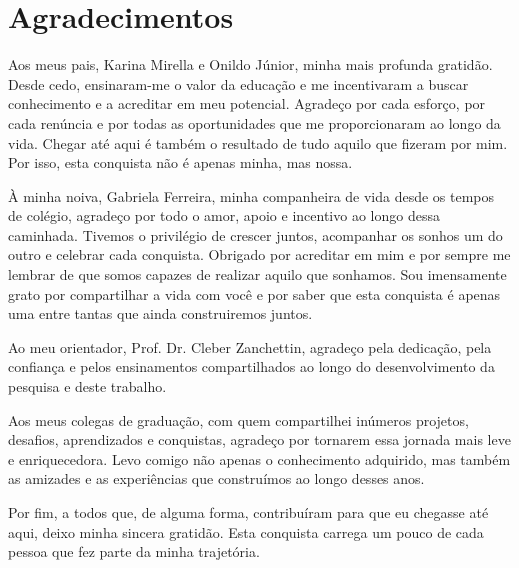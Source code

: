 \section*{Agradecimentos}

Aos meus pais, Karina Mirella e Onildo Júnior, minha mais profunda gratidão. Desde cedo, ensinaram-me o valor da educação e me incentivaram a buscar conhecimento e a acreditar em meu potencial. Agradeço por cada esforço, por cada renúncia e por todas as oportunidades que me proporcionaram ao longo da vida. Chegar até aqui é também o resultado de tudo aquilo que fizeram por mim. Por isso, esta conquista não é apenas minha, mas nossa.

À minha noiva, Gabriela Ferreira, minha companheira de vida desde os tempos de colégio, agradeço por todo o amor, apoio e incentivo ao longo dessa caminhada. Tivemos o privilégio de crescer juntos, acompanhar os sonhos um do outro e celebrar cada conquista. Obrigado por acreditar em mim e por sempre me lembrar de que somos capazes de realizar aquilo que sonhamos. Sou imensamente grato por compartilhar a vida com você e por saber que esta conquista é apenas uma entre tantas que ainda construiremos juntos.

Ao meu orientador, Prof. Dr. Cleber Zanchettin, agradeço pela dedicação, pela confiança e pelos ensinamentos compartilhados ao longo do desenvolvimento da pesquisa e deste trabalho.

Aos meus colegas de graduação, com quem compartilhei inúmeros projetos, desafios, aprendizados e conquistas, agradeço por tornarem essa jornada mais leve e enriquecedora. Levo comigo não apenas o conhecimento adquirido, mas também as amizades e as experiências que construímos ao longo desses anos.

Por fim, a todos que, de alguma forma, contribuíram para que eu chegasse até aqui, deixo minha sincera gratidão. Esta conquista carrega um pouco de cada pessoa que fez parte da minha trajetória.